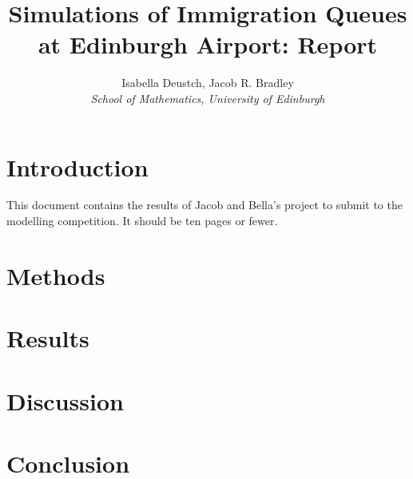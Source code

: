 \documentclass[12pt]{article}
\title{Simulations of Immigration Queues at Edinburgh Airport: Report}
\author{Isabella Deustch, Jacob R. Bradley
 \\ \emph{School of Mathematics, University of Edinburgh}}
\begin{document}
\maketitle

\section{Introduction}
This document contains the results of Jacob and Bella's project to submit to the modelling competition. It should be ten pages or fewer. 
\section{Methods}
\section{Results}
\section{Discussion}
\section{Conclusion}
% 
\end{document}
